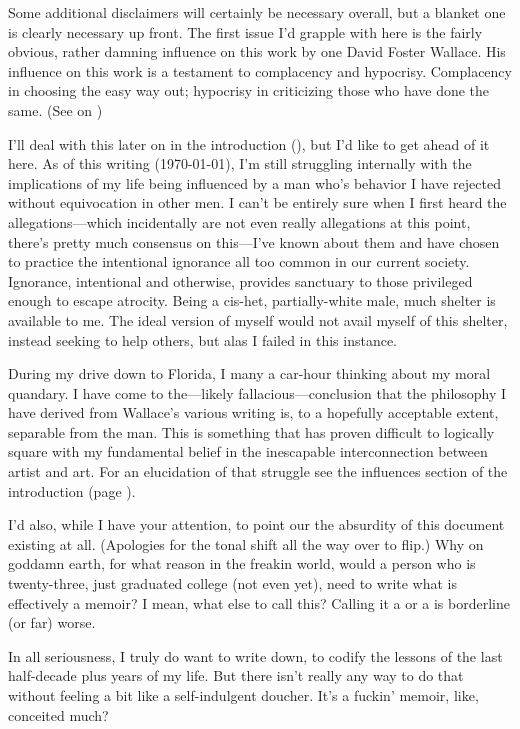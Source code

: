 \vspace*{\fill}
{\normalsize Some additional disclaimers will certainly be necessary overall, but a blanket one is clearly necessary up front.
The first issue I'd grapple with here is the fairly obvious, rather damning influence on this work by one David Foster Wallace.
His influence on this work is a testament to complacency and hypocrisy.
Complacency in choosing the easy way out; hypocrisy in criticizing those who have done the same.
(See  on )

I'll deal with this later on in the introduction (), but I'd like to get ahead of it here.
As of this writing (\today), I'm still struggling internally with the implications of my life being influenced by a man who's behavior I have rejected without equivocation in other men.
I can't be entirely sure when I first heard the allegations---which incidentally are not even really allegations at this point, there's pretty much consensus on this---I've known about them and have chosen to practice the intentional ignorance all too common in our current society.
Ignorance, intentional and otherwise, provides sanctuary to those privileged enough to escape atrocity.
Being a cis-het, partially-white male, much shelter is available to me.
The ideal version of myself would not avail myself of this shelter, instead seeking to help others, but alas I failed in this instance.

During my drive down to Florida, I many a car-hour thinking about my moral quandary.
I have come to the---likely fallacious---conclusion that the philosophy I have derived from Wallace's various writing is, to a hopefully acceptable extent, separable from the man.
This is something that has proven difficult to logically square with my fundamental belief in the inescapable interconnection between artist and art.
For an elucidation of that struggle see the influences section of the introduction (page \pageref{sec:influences}).

I'd also, while I have your attention, to point our the absurdity of this document existing at all.
(Apologies for the tonal shift all the way over to flip.)
Why on goddamn earth, for what reason in the freakin world, would a person who is twenty-three, just graduated college (not even yet), need to write what is effectively a memoir?
I mean, what else to call this?
Calling it a  or a  is borderline (or far) worse.

In all seriousness, I truly do want to write down, to codify the lessons of the last half-decade plus years of my life.
But there isn't really any way to do that without feeling a bit like a self-indulgent doucher.
It's a fuckin' memoir, like, conceited much?}

